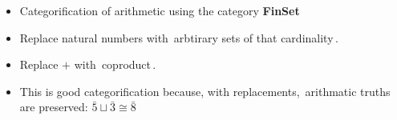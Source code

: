 
\begin{itemize}
    \item Categorification of arithmetic using the category \textbf{FinSet}
    \item Replace natural numbers with \,arbtirary sets of that cardinality\,.
    \item Replace $+$ with \,coproduct\,.
    \item This is good categorification because, with replacements, \,arithmatic truths are preserved: $\bar{5}\sqcup \bar{3} \cong \bar{8}$\,

  \end{itemize}
